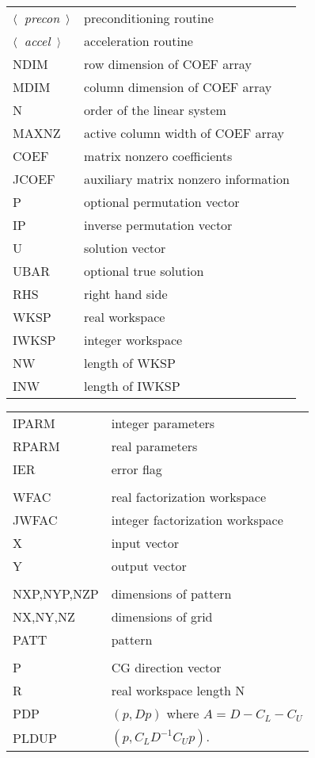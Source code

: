 \begin{tabular}{ll}
$\langle$~{\em precon}~$\rangle$ & preconditioning routine \\
$\langle$~{\em accel}~$\rangle$  & acceleration routine \\
NDIM   & row dimension of COEF array \\
MDIM   & column dimension of COEF array \\
N      & order of the linear system \\
MAXNZ  & active column width of COEF array \\
COEF   & matrix nonzero coefficients \\
JCOEF  & auxiliary matrix nonzero information \\
P      & optional permutation vector \\
IP     & inverse permutation vector \\
U      & solution vector \\
UBAR   & optional true solution \\
RHS    & right hand side \\
WKSP   & real workspace \\
IWKSP  & integer workspace \\
NW     & length of WKSP \\
INW    & length of IWKSP 
\end{tabular}
\begin{tabular}{ll}
IPARM  & integer parameters \\
RPARM  & real parameters \\
IER    & error flag \\
       &             \\
WFAC   & real factorization workspace \\
JWFAC  & integer factorization workspace \\
X      & input vector \\
Y      & output vector \\
       &               \\
NXP,NYP,NZP & dimensions of pattern \\
NX,NY,NZ    & dimensions of grid \\
PATT        & pattern \\
       &              \\
P      & CG direction vector \\
R      & real workspace length N \\
PDP    & $(p,Dp)$ where $A=D-C_L-C_U$ \\
PLDUP  & $(p,C_LD^{-1}C_Up)$.
\end{tabular}

